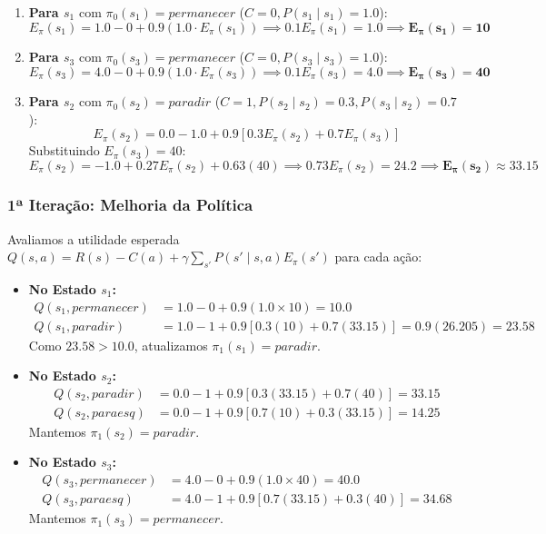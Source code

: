 \documentclass[a4paper,12pt]{article}
\begin{document}
\begin{enumerate}
	\item \textbf{Para $s_1$} com $\pi_0(s_1) = \textit{permanecer}$ ($C=0, P(s_1 \mid s_1) = 1.0$):
	\[
	E_\pi(s_1) = 1.0 - 0 + 0.9 (1.0 \cdot E_\pi(s_1)) \implies 0.1 E_\pi(s_1) = 1.0 \implies \mathbf{E_\pi(s_1) = 10}
	\]
	
	\item \textbf{Para $s_3$} com $\pi_0(s_3) = \textit{permanecer}$ ($C=0, P(s_3 \mid s_3) = 1.0$):
	\[
	E_\pi(s_3) = 4.0 - 0 + 0.9 (1.0 \cdot E_\pi(s_3)) \implies 0.1 E_\pi(s_3) = 4.0 \implies \mathbf{E_\pi(s_3) = 40}
	\]
	
	\item \textbf{Para $s_2$} com $\pi_0(s_2) = \textit{paradir}$ ($C=1, P(s_2 \mid s_2) = 0.3, P(s_3 \mid s_2) = 0.7$):
	\[
	E_\pi(s_2) = 0.0 - 1.0 + 0.9 [0.3 E_\pi(s_2) + 0.7 E_\pi(s_3)]
	\]
	Substituindo $E_\pi(s_3) = 40$:
	\[
	E_\pi(s_2) = -1.0 + 0.27 E_\pi(s_2) + 0.63(40) \implies 0.73 E_\pi(s_2) = 24.2 \implies \mathbf{E_\pi(s_2) \approx 33.15}
	\]
\end{enumerate}

\subsubsection*{1ª Iteração: Melhoria da Política}
Avaliamos a utilidade esperada $Q(s, a) = R(s) - C(a) + \gamma \sum_{s'} P(s' \mid s, a) E_\pi(s')$ para cada ação:

\begin{itemize}
	\item \textbf{No Estado $s_1$:}
	\begin{align*}
		Q(s_1, \textit{permanecer}) &= 1.0 - 0 + 0.9(1.0 \times 10) = \mathbf{10.0} \\
		Q(s_1, \textit{paradir}) &= 1.0 - 1 + 0.9[0.3(10) + 0.7(33.15)] = 0.9(26.205) = \mathbf{23.58}
	\end{align*}
	Como $23.58 > 10.0$, atualizamos $\pi_1(s_1) = \mathbf{\textit{paradir}}$.
	
	\item \textbf{No Estado $s_2$:}
	\begin{align*}
		Q(s_2, \textit{paradir}) &= 0.0 - 1 + 0.9[0.3(33.15) + 0.7(40)] = \mathbf{33.15} \\
		Q(s_2, \textit{paraesq}) &= 0.0 - 1 + 0.9[0.7(10) + 0.3(33.15)] = \mathbf{14.25}
	\end{align*}
	Mantemos $\pi_1(s_2) = \mathbf{\textit{paradir}}$.
	
	\item \textbf{No Estado $s_3$:}
	\begin{align*}
		Q(s_3, \textit{permanecer}) &= 4.0 - 0 + 0.9(1.0 \times 40) = \mathbf{40.0} \\
		Q(s_3, \textit{paraesq}) &= 4.0 - 1 + 0.9[0.7(33.15) + 0.3(40)] = \mathbf{34.68}
	\end{align*}
	Mantemos $\pi_1(s_3) = \mathbf{\textit{permanecer}}$.
\end{itemize}
\end{document}
